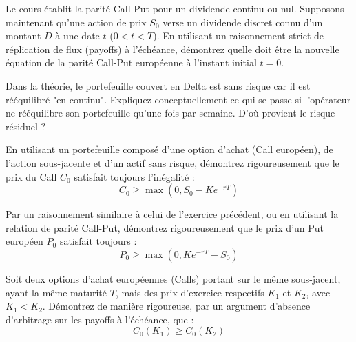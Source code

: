 \begin{exercicebox}
Le cours établit la parité Call-Put pour un dividende continu ou nul. Supposons maintenant qu'une action de prix $S_0$ verse un dividende discret connu d'un montant $D$ à une date $t$ ($0 < t < T$).
En utilisant un raisonnement strict de réplication de flux (payoffs) à l'échéance, démontrez quelle doit être la nouvelle équation de la parité Call-Put européenne à l'instant initial $t=0$.
\end{exercicebox}

\begin{exercicebox}
Dans la théorie, le portefeuille couvert en Delta est sans risque car il est rééquilibré "en continu".
Expliquez conceptuellement ce qui se passe si l'opérateur ne rééquilibre son portefeuille qu'une fois par semaine. D'où provient le risque résiduel ?
\end{exercicebox}

\begin{exercicebox}
En utilisant un portefeuille composé d'une option d'achat (Call européen), de l'action sous-jacente et d'un actif sans risque, démontrez rigoureusement que le prix du Call $C_0$ satisfait toujours l'inégalité :
\begin{equation*}
    C_0 \geq \max(0, S_0 - K e^{-rT})
\end{equation*}
\end{exercicebox}

\begin{exercicebox}
Par un raisonnement similaire à celui de l'exercice précédent, ou en utilisant la relation de parité Call-Put, démontrez rigoureusement que le prix d'un Put européen $P_0$ satisfait toujours :
\begin{equation*}
    P_0 \geq \max(0, K e^{-rT} - S_0)
\end{equation*}
\end{exercicebox}

\begin{exercicebox}
Soit deux options d'achat européennes (Calls) portant sur le même sous-jacent, ayant la même maturité $T$, mais des prix d'exercice respectifs $K_1$ et $K_2$, avec $K_1 < K_2$.
Démontrez de manière rigoureuse, par un argument d'absence d'arbitrage sur les payoffs à l'échéance, que :
\begin{equation*}
    C_0(K_1) \geq C_0(K_2)
\end{equation*}
\end{exercicebox}

